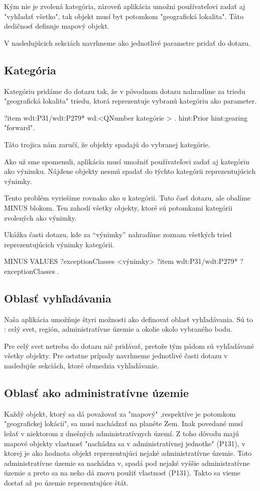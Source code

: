 Kým nie je zvolená kategória, zároveň aplikácia umožni používateľovi zadať aj "vyhľadať všetko", tak 
objekt musí byt potomkom "geografická lokalita". Táto dedičnosť definuje mapový objekt. 

V nasledujúcich sekciách navrhneme ako jednotlivé parametre pridať do dotazu.

\subsection*{Kategória}
Kategóriu pridáme do dotazu tak, že v pôvodnom dotazu nahradíme za triedu "geografická lokalita" 
triedu, ktorá reprezentuje vybranú kategóriu ako parameter. 
\begin{code}
      ?item wdt:P31/wdt:P279* wd:<QNumber kategórie > .
      hint:Prior hint:gearing "forward".
\end{code}
Táto trojica nám zaručí, že objekty spadajú do vybranej kategórie. 

Ako už sme spomenuli, aplikácia musí umožniť používateľovi zadať aj kategóriu ako výnimku. Nájdene objekty nesmú spadať do 
týchto kategórii reprezentujúcich výnimky. 

Tento problém vyriešime rovnako ako u kategórii. Tuto časť dotazu, ale obalíme MINUS blokom. Ten zahodí všetky objekty, ktoré 
sú potomkami kategórii zvolených ako výnimky. 

Ukážka časti dotazu, kde za “výnimky” nahradíme zoznam všetkých tried reprezentujúcich výnimky kategórii. 
\begin{code}
      MINUS{
      VALUES ?exceptionClasses {<výnimky> }
      ?item wdt:P31/wdt:P279* ?exceptionClasses .
      }
\end{code}

\subsection*{Oblasť vyhľadávania }
Naša aplikácia umožňuje štyri možnosti ako definovať oblasť vyhľadávania. 
Sú to : celý svet, región, administratívne územie a okolie okolo vybraného bodu. 

Pre celý svet netreba do dotazu nič pridávať, pretože tým pádom sú vyhľadávané všetky objekty. 
Pre ostatne prípady navrhneme jednotlivé časti dotazu v nasledujúc sekciách, ktoré obmedzia vyhľadávanie. 

\subsection*{Oblasť ako administratívne územie}
Každý objekt, ktorý sa dá považovať za "mapový" ,respektíve je potomkom "geografickej lokácii", sa musí nachádzať na planéte Zem. 
Inak povedané musí ležať v niektorom z dnešných administratívnych území. 
Z toho dôvodu majú mapové objekty vlastnosť "nachádza sa v administratívnej jednotke" (P131), v ktorej je ako hodnota objekt reprezentujúci nejaké 
administratívne územie. Toto administratívne územie sa nachádza v, spadá pod nejaké vyššie administratívne územie a preto sa na neho dá znovu použiť 
vlastnosť (P131). Takto sa vieme dostať až po územie reprezentujúce štát. 

